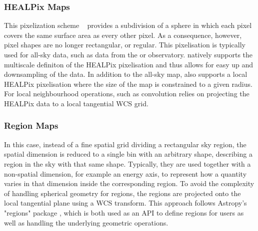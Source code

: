 \documentclass[traditabstract, longauth]{aa}
\begin{document}
{\subsubsection{HEALPix Maps}
This pixelization scheme ~\citep{Calabretta2002} provides a
subdivision of a sphere in which each pixel covers the same surface area as
every other pixel. As a consequence, however, pixel shapes are no longer
rectangular, or regular.
This pixelisation is typically used for all-sky data, such as data
from the \hawc or \fermi observatory. \gammapy natively supports
the multiscale definiton of the HEALPix pixelisation and thus
allows for easy up and downsampling of the data. In addition to
the all-sky map, \gammapy also supports a local HEALPix
pixelisation where the size of the map is constrained to a given
radius.
For local neighbourhood operations, such as convolution \gammapy relies
on projecting the HEALPix data to a local tangential WCS grid.

\subsubsection{Region Maps}
In this case, instead of a fine spatial grid
dividing a rectangular sky region, the spatial dimension is reduced to a single
bin with an arbitrary shape, describing a region in the sky with that same
shape. Typically, they are used together with a non-spatial dimension, for
example an energy axis, to represent how a quantity varies in that dimension
inside the corresponding region. To avoid the complexity of handling
spherical geometry for regions, the regions are projected onto the local
tangential plane using a WCS transform. This approach follows Astropy's "regions"
package \citep{AstropyRegions2022}, which is both used as an API to define regions
for users as well as handling the underlying geometric operations.


}
\end{document}
